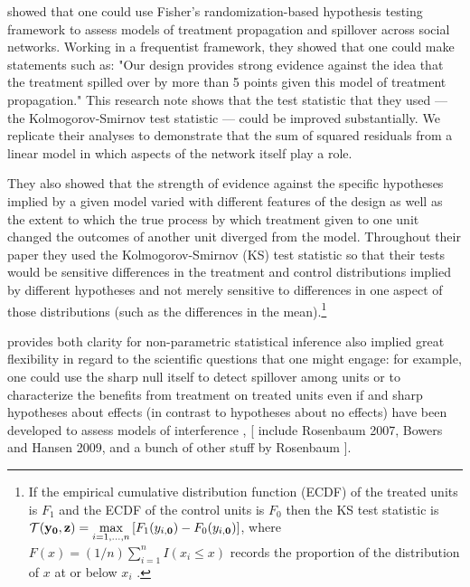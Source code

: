 
 \citet{bowers2013sutva} showed that one could use Fisher's
 randomization-based hypothesis testing framework to assess models of
 treatment propagation and spillover across social networks. Working in a
 frequentist framework, they showed that one could make statements such as:
 "Our design provides strong evidence against the idea that the treatment
 spilled over by more than 5 points given this model of treatment
 propagation." This research note shows that the test statistic that they used
 --- the Kolmogorov-Smirnov test statistic  \citep[\S
 5.4]{MylesHollander1999a} --- could be improved substantially. We replicate
 their analyses to demonstrate that the sum of squared residuals from a linear
 model in which aspects of the network itself play a role. 

 

 They also showed that the strength of evidence against the
 specific hypotheses implied by a given model varied with different features
 of the design as well as the extent to which the true process by which
 treatment given to one unit changed the outcomes of another unit diverged
 from the model. Throughout their paper they used the  Kolmogorov-Smirnov (KS)
 test statistic so that their tests would be sensitive differences in the
 treatment and control distributions implied by different hypotheses and not
 merely sensitive to differences in one aspect of those distributions (such as
 the differences in the mean).\footnote{If the empirical cumulative distribution function (ECDF) of
   the treated units is $F_1$ and the ECDF of the control units is $F_0$ then
   the KS test statistic is
   $\mathcal{T}(\mathbf{y}_{\mathbf{0}},\mathbf{z}) = \underset{i = 1,\ldots,n}{\text{max}}\left[F_1(y_{i,\mathbf{0}})
     - F_0(y_{i,\mathbf{0}})\right]$, where $F(x)=(1/n)\sum_{i=1}^n I(x_i \le x)$
   records the proportion of the distribution of $x$ at or below $x_i$
   \citep[\S 5.4]{MylesHollander1999a}.} 
 
 provides both clarity for
 non-parametric statistical inference  also implied great flexibility in regard to the scientific questions
that one might engage: for example, one could use the sharp null itself to
detect spillover  among units \citep{aronow-general} or to characterize the
benefits from treatment on treated units even if  and sharp hypotheses
about effects (in contrast to hypotheses about no effects) have been developed
to assess models of interference \citep{bowers2013sutva}, [ include Rosenbaum
2007, Bowers and Hansen 2009, and a bunch of other stuff by Rosenbaum ].



